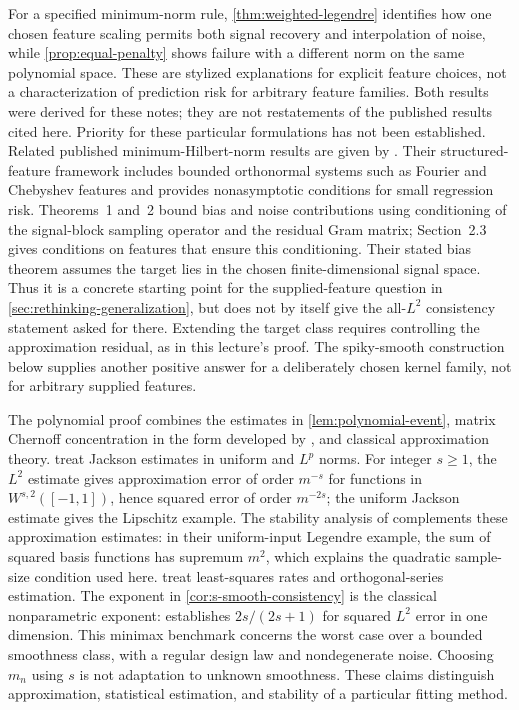 \documentclass[11pt,twoside]{article}
\theoremstyle{definition}
\theoremstyle{remark}
\begin{document}
For a specified minimum-norm rule, \cref{thm:weighted-legendre} identifies
how one chosen feature scaling permits both signal recovery and interpolation
of noise, while \cref{prop:equal-penalty} shows failure with a different norm
on the same polynomial space. These are stylized explanations for explicit
feature choices, not a characterization of prediction risk for arbitrary
feature families. Both results were derived for these notes; they are not
restatements of the published results cited here. Priority for these
particular formulations has not been established. Related published
minimum-Hilbert-norm results are given by \citet{mcrae2022}. Their
structured-feature framework includes bounded orthonormal systems such as
Fourier and Chebyshev features and provides nonasymptotic conditions for
small regression risk. Theorems~1 and~2 bound bias and noise contributions
using conditioning of the signal-block sampling operator and the residual
Gram matrix; Section~2.3 gives conditions on features that ensure this
conditioning. Their stated bias theorem assumes the target lies in the
chosen finite-dimensional signal space. Thus it is a concrete starting
point for the supplied-feature question in
\cref{sec:rethinking-generalization}, but does not by itself give the
all-$L^2$ consistency statement asked for there. Extending the target class
requires controlling the approximation residual, as in this lecture's
proof. The spiky-smooth construction below supplies another positive
answer for a deliberately chosen kernel family, not for arbitrary supplied
features.

The polynomial proof combines the estimates in \cref{lem:polynomial-event},
matrix Chernoff concentration in the form developed by \citet{tropp2012},
and classical approximation theory. \citet{devore1993} treat Jackson
estimates in uniform and $L^p$ norms. For integer $s\ge1$, the $L^2$
estimate gives approximation error of order $m^{-s}$ for functions in
$W^{s,2}([-1,1])$, hence squared error of order $m^{-2s}$; the uniform
Jackson estimate gives the Lipschitz example. The stability analysis of
\citet{cohen2013} complements these approximation estimates: in their
uniform-input Legendre example, the sum of squared basis functions has
supremum $m^2$, which explains the quadratic sample-size condition used
here. \citet[Chapters 11 and 18]{gyorfi2002} treat least-squares rates and
orthogonal-series estimation. The exponent in
\cref{cor:s-smooth-consistency} is the classical nonparametric exponent:
\citet{stone1982} establishes $2s/(2s+1)$ for squared $L^2$ error in one
dimension. This minimax benchmark concerns the worst case over a bounded
smoothness class, with a regular design law and nondegenerate noise.
Choosing $m_n$ using $s$ is not adaptation to unknown smoothness. These
claims distinguish approximation, statistical estimation, and stability of
a particular fitting method.
\end{document}
